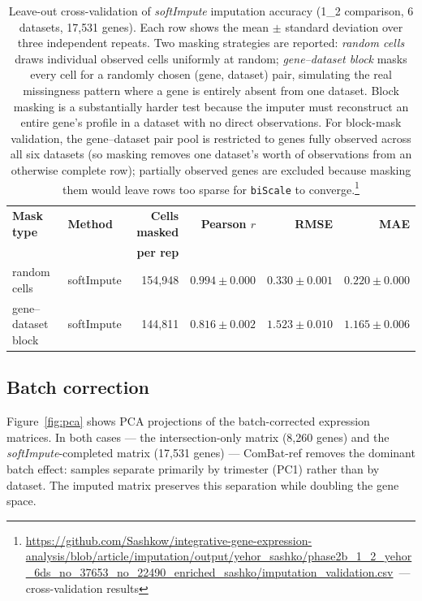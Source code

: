 \documentclass[11pt,a4paper]{article}
\newcommand{\ghb}{https://github.com/Sashkow/integrative-gene-expression-analysis/blob/article/imputation}
\newcommand{\src}[2]{\footnote{\url{\ghb/#1}~--- #2}}
\begin{document}
\begin{table}[h]
\centering
\footnotesize
\begin{tabular}{@{}llrrrr@{}}
\toprule
\textbf{Mask type} & \textbf{Method} &
  \textbf{Cells masked} & \textbf{Pearson $r$} &
  \textbf{RMSE} & \textbf{MAE} \\
  & & \textbf{per rep} & & & \\
\midrule
random cells        & softImpute & 154{,}948 &
  $0.994 \pm 0.000$ & $0.330 \pm 0.001$ &
  $0.220 \pm 0.000$ \\
\addlinespace
gene--dataset block & softImpute & 144{,}811 &
  $0.816 \pm 0.002$ & $1.523 \pm 0.010$ &
  $1.165 \pm 0.006$ \\
\bottomrule
\end{tabular}
\caption{Leave-out cross-validation of \textit{softImpute}
  imputation accuracy (1\_2 comparison, 6 datasets, 17{,}531
  genes). Each row shows the mean $\pm$ standard deviation over
  three independent repeats. Two masking strategies are reported:
  \emph{random cells} draws individual observed cells uniformly
  at random; \emph{gene--dataset block} masks every cell for a
  randomly chosen (gene, dataset) pair, simulating the real
  missingness pattern where a gene is entirely absent from one
  dataset. Block masking is a substantially harder test because
  the imputer must reconstruct an entire gene's profile in a
  dataset with no direct observations. For block-mask validation,
  the gene--dataset pair pool is restricted to genes fully
  observed across all six datasets (so masking removes one dataset's worth of
  observations from an otherwise complete row); partially observed
  genes are excluded because masking them would leave rows too
  sparse for \texttt{biScale} to converge.\src{output/yehor_sashko/phase2b_1_2_yehor_6ds_no_37653_no_22490_enriched_sashko/imputation_validation.csv}{cross-validation results}}
\label{tab:imputation}
\end{table}

\subsection{Batch correction}

Figure~\ref{fig:pca} shows PCA projections of the
batch-corrected expression matrices. In both cases --- the
intersection-only matrix (8{,}260 genes) and the
\textit{softImpute}-completed matrix (17{,}531 genes) ---
ComBat-ref removes the dominant batch effect: samples separate
primarily by trimester (PC1) rather than by dataset. The
imputed matrix preserves this separation while doubling the
gene space.
\end{document}
